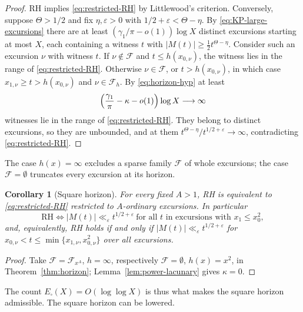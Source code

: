 \documentclass[11pt]{amsart}
\numberwithin{equation}{section}
\theoremstyle{plain}
\newtheorem{corollary}[theorem]{Corollary}
\theoremstyle{definition}
\theoremstyle{remark}
\newcommand{\eps}{\varepsilon}
\newcommand{\F}{\mathcal{F}}
\begin{document}
\begin{proof}
RH implies \eqref{eq:restricted-RH} by Littlewood's criterion. Conversely,
suppose $\Theta>1/2$ and fix $\eta,\eps>0$ with
$1/2+\eps<\Theta-\eta$. By \eqref{eq:KP-large-excursions} there are at least
$(\gamma_1/\pi-o(1))\log X$ distinct excursions starting at most $X$, each
containing a witness $t$ with $|M(t)|\ge\frac12t^{\Theta-\eta}$. Consider
such an excursion $\nu$ with witness $t$. If $\nu\notin\F$ and
$t\le h(x_{0,\nu})$, the witness lies in the range of
\eqref{eq:restricted-RH}. Otherwise $\nu\in\F$, or $t>h(x_{0,\nu})$, in
which case $x_{1,\nu}\ge t>h(x_{0,\nu})$ and $\nu\in\F_h$. By
\eqref{eq:horizon-hyp} at least
\[
\Bigl(\frac{\gamma_1}{\pi}-\kappa-o(1)\Bigr)\log X\longrightarrow\infty
\]
witnesses lie in the range of \eqref{eq:restricted-RH}. They belong to
distinct excursions, so they are unbounded, and at them
$t^{\Theta-\eta}/t^{1/2+\eps}\to\infty$, contradicting
\eqref{eq:restricted-RH}.
\end{proof}

The case $h(x)=\infty$ excludes a sparse family $\F$ of whole excursions;
the case $\F=\emptyset$ truncates every excursion at its horizon.

\begin{corollary}[Square horizon]
\label{cor:power-ordinary-RH}
\label{cor:square-truncated-RH}
For every fixed $A>1$, RH is equivalent to \eqref{eq:restricted-RH}
restricted to $A$-ordinary excursions. In particular
\begin{equation}
\label{eq:square-horizon-RH}
\boxed{\ \mathrm{RH}\iff
|M(t)|\ll_\eps t^{1/2+\eps}
\ \text{for all $t$ in excursions with }x_1\le x_0^2,\ }
\end{equation}
and, equivalently, RH holds if and only if
$|M(t)|\ll_\eps t^{1/2+\eps}$ for $x_{0,\nu}<t\le\min\{x_{1,\nu},x_{0,\nu}^2\}$
over all excursions.
\end{corollary}

\begin{proof}
Take $\F=\F_{x^A}$, $h=\infty$, respectively $\F=\emptyset$, $h(x)=x^2$, in
Theorem~\ref{thm:horizon}; Lemma~\ref{lem:power-lacunary} gives
$\kappa=0$.
\end{proof}

The count $E_\square(X)=O(\log\log X)$ is thus what makes the square
horizon admissible. The square horizon can be lowered.
\end{document}
